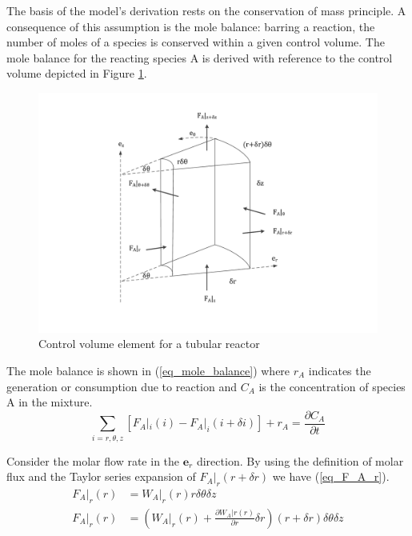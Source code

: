\documentclass[11pt,fleqn]{article}
\theoremstyle{defstyle}
\begin{document}
The basis of the model's derivation rests on the conservation of mass principle. A consequence of this assumption is the mole balance: barring a reaction, the number of moles of a species is conserved within a given control volume. The mole balance for the reacting species A is derived with reference to the control volume depicted in Figure \ref{fig_vol_element}.

\begin{figure}[H] 
\centering
\includegraphics[scale=0.5]{volume_element}
\caption{Control volume element for a tubular reactor} 
\label{fig_vol_element}
\end{figure}

The mole balance is shown in (\ref{eq_mole_balance}) where $r_A$ indicates the generation or consumption due to reaction and $C_A$ is the concentration of species A in the mixture.
\begin{equation}
\sum_{i=r, \theta, z}[F_A|_i(i) - F_A|_i(i+\delta i)] + r_A = \frac{\partial C_A}{\partial t}
\label{eq_mole_balance}
\end{equation}

Consider the molar flow rate in the $\mathbf{e}_r$ direction. By using the definition of molar flux and the Taylor series expansion of $F_A|_r(r+\delta r)$ we have (\ref{eq_F_A_r}).
\begin{equation}
\begin{aligned}
F_A|_r(r) &= W_A|_r(r) r \delta \theta \delta z \\
F_A|_r(r) &= (W_ A|_r(r) + \frac{\partial W_A|r(r)}{\partial r} \delta r)(r+\delta r)\delta \theta \delta z
\end{aligned}
\label{eq_F_A_r}
\end{equation}




\newpage


\end{document}
